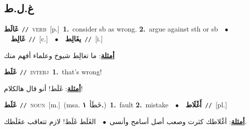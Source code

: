 \documentclass[10pt,a4paper,twoside]{article} %
\begin{document}
\begin{multicols}{2}
\vspace{-3mm}
\subsection*{\color{blue}\foreignlanguage{arabic}{غ.ل.ط}\color{blue}{}} 

{\setlength\topsep{0pt}\textbf{\foreignlanguage{arabic}{غَالَط}}\ {\color{gray}\texttt{//}\color{black}}\ \textsc{verb}\ [p.]\ \textbf{1.}~consider sb as wrong.  \textbf{2.}~argue against sth or sb\ \ $\bullet$\ \ \setlength\topsep{0pt}\textbf{\foreignlanguage{arabic}{غَالِط}}\ {\color{gray}\texttt{//}\color{black}}\ [c.]\ \ $\bullet$\ \ \setlength\topsep{0pt}\textbf{\foreignlanguage{arabic}{يغَالِط}}\ {\color{gray}\texttt{//}\color{black}}\ [i.]\  \begin{flushright}\color{gray}\foreignlanguage{arabic}{\textbf{\underline{\foreignlanguage{arabic}{أمثلة}}}: ما تغالِط شيوخ وعلماء أفهم منك}\end{flushright}\color{black}} \vspace{2mm}

{\setlength\topsep{0pt}\textbf{\foreignlanguage{arabic}{غَلَط}}\ {\color{gray}\texttt{//}\color{black}}\ \textsc{interj}\ \textbf{1.}~that's wrong!\  \begin{flushright}\color{gray}\foreignlanguage{arabic}{\textbf{\underline{\foreignlanguage{arabic}{أمثلة}}}: غَلَط! أنو قال هالكلام!}\end{flushright}\color{black}} \vspace{2mm}

{\setlength\topsep{0pt}\textbf{\foreignlanguage{arabic}{غَلَط}}\ {\color{gray}\texttt{//}\color{black}}\ \textsc{noun}\ [m.]\ \color{gray}(msa. \foreignlanguage{arabic}{خَطَأ}~\foreignlanguage{arabic}{\textbf{١.}})\color{black}\ \textbf{1.}~fault  \textbf{2.}~mistake\ \ $\bullet$\ \ \setlength\topsep{0pt}\textbf{\foreignlanguage{arabic}{أَغْلَاط}}\ {\color{gray}\texttt{//}\color{black}}\ [pl.]\  \begin{flushright}\color{gray}\foreignlanguage{arabic}{\textbf{\underline{\foreignlanguage{arabic}{أمثلة}}}: أغْلاطك كثرت وصعب أصل أسامح وأنسى\ $\bullet$\ \  الغَلَط غَلَط! لازم تتعاقب عغَلَطك.}\end{flushright}\color{black}} \vspace{2mm}


\end{multicols}
\end{document}
